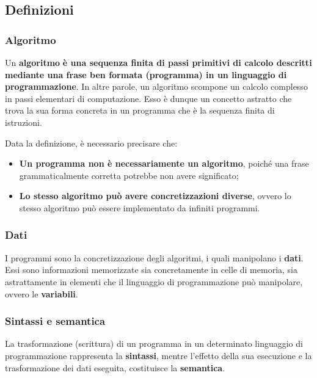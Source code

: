 \documentclass[a4paper]{article}
\begin{document}
	\subsection{Definizioni}
	
	\subsubsection{Algoritmo}
	
	Un \textcolor{Red3}{\textbf{algoritmo}} \textbf{è una sequenza finita di passi primitivi di calcolo descritti mediante una frase ben formata (programma) in un linguaggio di programmazione}. In altre parole, un algoritmo scompone un calcolo complesso in passi elementari di computazione. Esso è dunque un concetto astratto che trova la sua forma concreta in un programma che è la sequenza finita di istruzioni.\newline
	
	\noindent
	Data la definizione, è necessario precisare che:
	\begin{itemize}
		\item \textbf{Un programma non è necessariamente un algoritmo}, poiché una frase grammaticalmente corretta potrebbe non avere significato;
		\item \textbf{Lo stesso algoritmo può avere concretizzazioni diverse}, ovvero lo stesso algoritmo può essere implementato da infiniti programmi.
	\end{itemize}

	\subsubsection{Dati}

	I programmi sono la concretizzazione degli algoritmi, i quali manipolano i \textcolor{Red3}{\textbf{dati}}. Essi sono informazioni memorizzate sia concretamente in celle di memoria, sia astrattamente in elementi che il linguaggio di programmazione può manipolare, ovvero le \textbf{variabili}.
	
	\subsubsection{Sintassi e semantica}

	La trasformazione (scrittura) di un programma in un determinato linguaggio di programmazione rappresenta la \textcolor{Red3}{\textbf{sintassi}}, mentre l'effetto della sua esecuzione e la trasformazione dei dati eseguita, costituisce la \textcolor{Red3}{\textbf{semantica}}.
	
\end{document}

